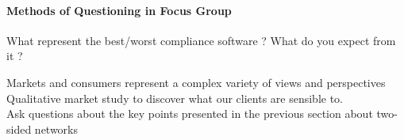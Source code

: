 \documentclass[10pt]{report}
\begin{document}
\paragraph{Methods of Questioning in Focus Group}
What represent the best/worst compliance software ?
What do you expect from it ?


Markets and consumers represent a complex variety of views and perspectives\\
Qualitative market study to discover what our clients are sensible to.\\
Ask questions about the key points presented in the previous section about two-sided networks\\

\newpage

\newpage

\pagestyle{plain}

\nocite{*}
\setlength{\bibitemsep}{5pt}

\printbibliography[title={Technological references},keyword={tech}, heading=subbibliography]
\printbibliography[title={Strategic references},keyword={strat}, heading=subbibliography]

\printbibliography[title={Other references}, notkeyword={tech}, notkeyword={strat}, heading=subbibliography]
\end{document}
